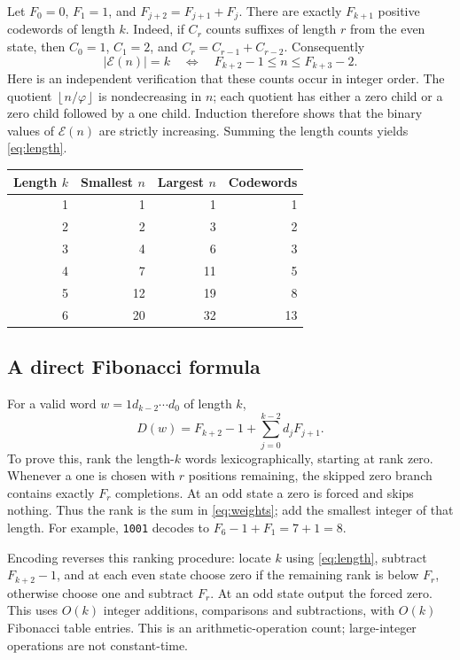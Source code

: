 \documentclass[11pt]{article}
\theoremstyle{definition}\newtheorem{definition}[theorem]{Definition}
\newcommand{\ph}{\varphi}
\newcommand{\fl}[1]{\left\lfloor #1\right\rfloor}
\newcommand{\E}{\mathcal E}
\begin{document}
Let $F_0=0$, $F_1=1$, and $F_{j+2}=F_{j+1}+F_j$.
There are exactly $F_{k+1}$ positive codewords of length $k$.
Indeed, if $C_r$ counts suffixes of length $r$ from the even state,
then $C_0=1$, $C_1=2$, and $C_r=C_{r-1}+C_{r-2}$.
Consequently
\begin{equation}\label{eq:length}
|\E(n)|=k\quad\Longleftrightarrow\quad
F_{k+2}-1\le n\le F_{k+3}-2.
\end{equation}
Here is an independent verification that these counts occur in integer
order. The quotient $\fl{n/\ph}$ is nondecreasing in $n$; each quotient
has either a zero child or a zero child followed by a one child.
Induction therefore shows that the binary values of $\E(n)$ are strictly
increasing. Summing the length counts yields \eqref{eq:length}.

\begin{center}
\begin{tabular}{rrrr}
\toprule
Length $k$ & Smallest $n$ & Largest $n$ & Codewords \\
\midrule
1&1&1&1\\2&2&3&2\\3&4&6&3\\4&7&11&5\\5&12&19&8\\6&20&32&13\\
\bottomrule
\end{tabular}
\end{center}

\subsection{A direct Fibonacci formula}
For a valid word $w=1d_{k-2}\cdots d_0$ of length $k$,
\begin{equation}\label{eq:weights}
\boxed{\quad D(w)=F_{k+2}-1+\sum_{j=0}^{k-2}d_jF_{j+1}.\quad}
\end{equation}
To prove this, rank the length-$k$ words lexicographically, starting at
rank zero. Whenever a one is chosen with $r$ positions remaining,
the skipped zero branch contains exactly $F_r$ completions. At an odd
state a zero is forced and skips nothing. Thus the rank is the sum in
\eqref{eq:weights}; add the smallest integer of that length.
For example, \texttt{1001} decodes to $F_6-1+F_1=7+1=8$.

Encoding reverses this ranking procedure: locate $k$ using
\eqref{eq:length}, subtract $F_{k+2}-1$, and at each even state choose
zero if the remaining rank is below $F_r$, otherwise choose one and
subtract $F_r$. At an odd state output the forced zero.
This uses $O(k)$ integer additions, comparisons and subtractions, with
$O(k)$ Fibonacci table entries. This is an arithmetic-operation count;
large-integer operations are not constant-time.
\end{document}
